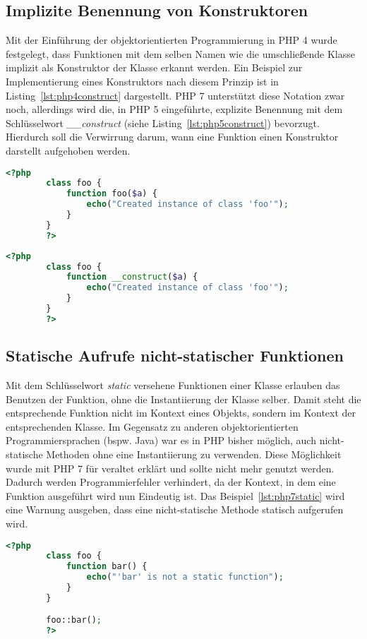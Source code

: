     \subsection{Implizite Benennung von Konstruktoren}
    Mit der Einführung der objektorientierten Programmierung in PHP 4 wurde festgelegt, dass Funktionen mit dem selben Namen wie die umschließende Klasse implizit als 
    Konstruktor der Klasse erkannt werden. Ein Beispiel zur Implementierung eines Konstruktors nach diesem Prinzip ist in Listing~\ref{lst:php4construct} dargestellt.
    PHP 7 unterstützt diese Notation zwar noch, allerdings wird die, in PHP 5 eingeführte, explizite Benennung mit dem Schlüsselwort \textit{\_\_construct} (siehe 
    Listing~\ref{lst:php5construct}) bevorzugt. Hierdurch soll die Verwirrung darum, wann eine Funktion einen Konstruktor darstellt aufgehoben werden. \cite{morrison_php:_2014}
    \begin{lstlisting}[language=php, caption={Beispiel eines impliziten Konstruktors}, label={lst:php4construct}]
        <?php
        class foo {
            function foo($a) {
                echo("Created instance of class 'foo'");
            }
        }
        ?>
    \end{lstlisting}

    \begin{lstlisting}[language=php, caption={Beispiel eines expliziten Konstruktors}, label={lst:php5construct}]
        <?php
        class foo {
            function __construct($a) {
                echo("Created instance of class 'foo'");
            }
        }
        ?>
    \end{lstlisting}
    
    \subsection{Statische Aufrufe nicht-statischer Funktionen}
    Mit dem Schlüsselwort \textit{static} versehene Funktionen einer Klasse erlauben das Benutzen der Funktion, ohne die 
    Instantiierung der Klasse selber. Damit steht die entsprechende Funktion nicht im Kontext eines Objekts, sondern 
    im Kontext der entsprechenden Klasse. Im Gegensatz zu anderen objektorientierten Programmiersprachen (bspw. Java) war es 
    in PHP bisher möglich, auch nicht-statische Methoden ohne eine Instantiierung zu verwenden. Diese Möglichkeit wurde mit
    PHP 7 für veraltet erklärt und sollte nicht mehr genutzt werden. Dadurch werden Programmierfehler verhindert, da der Kontext, in dem eine Funktion ausgeführt wird nun
    Eindeutig ist. Das Beispiel~\ref{lst:php7static} wird eine Warnung ausgeben, dass eine nicht-statische Methode statisch aufgerufen wird.
    \begin{lstlisting}[language=php, caption={Beispiel eines statischen Aufrufs einer nicht-satischen Funktion in PHP 7}, label={lst:php7static}]
        <?php
        class foo {
            function bar() {
                echo("'bar' is not a static function");
            }
        }

        foo::bar();
        ?>
    \end{lstlisting}

